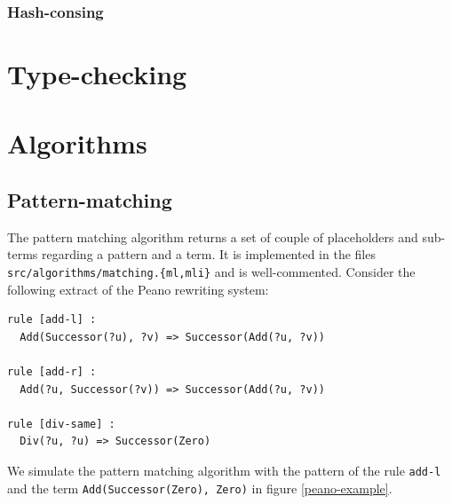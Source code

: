 \documentclass[12pt,a4paper]{article}
\begin{document}
\subsubsection{Hash-consing}
\label{data-term-hash-consing}


\section{Type-checking}
\label{typechecking}

\section{Algorithms}
\label{algorithms}

\subsection{Pattern-matching}
\label{pattern-matching}

The pattern matching algorithm returns a set of couple of placeholders and sub-terms regarding a pattern and a term. It is implemented in the files \texttt{src/algorithms/matching.\{ml,mli\}} and is well-commented. Consider the following extract of the Peano rewriting system:
\begin{lstlisting}
rule [add-l] :
  Add(Successor(?u), ?v) => Successor(Add(?u, ?v))

rule [add-r] :
  Add(?u, Successor(?v)) => Successor(Add(?u, ?v))

rule [div-same] :
  Div(?u, ?u) => Successor(Zero)
\end{lstlisting}

We simulate the pattern matching algorithm with the pattern of the rule \texttt{add-l} and the term \texttt{Add(Successor(Zero), Zero)} in figure \ref{peano-example}.
\end{document}
